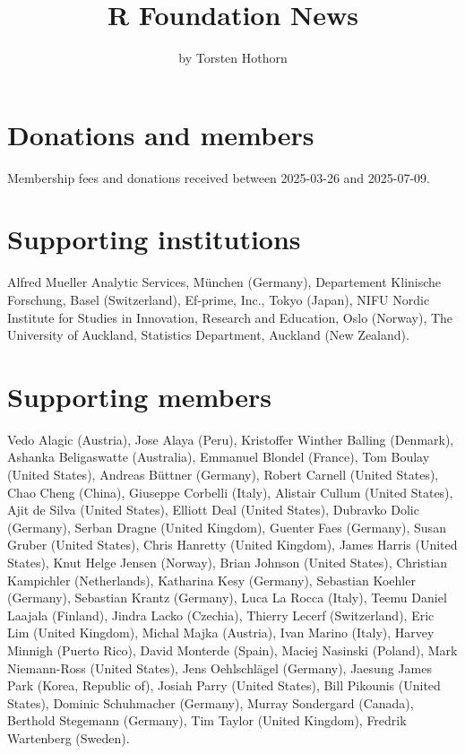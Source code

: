 \title{R Foundation News}


\author{by Torsten Hothorn}

\maketitle


\section{Donations and members}\label{donations-and-members}

Membership fees and donations received between
2025-03-26 and 2025-07-09.

\section{Supporting institutions}\label{supporting-institutions}

Alfred Mueller Analytic Services, München (Germany),
Departement Klinische Forschung, Basel (Switzerland),
Ef-prime, Inc., Tokyo (Japan),
NIFU Nordic Institute for Studies in Innovation, Research and Education, Oslo (Norway),
The University of Auckland, Statistics Department, Auckland (New Zealand).

\section{Supporting members}\label{supporting-members}

Vedo Alagic (Austria),
Jose Alaya (Peru),
Kristoffer Winther Balling (Denmark),
Ashanka Beligaswatte (Australia),
Emmanuel Blondel (France),
Tom Boulay (United States),
Andreas Büttner (Germany),
Robert Carnell (United States),
Chao Cheng (China),
Giuseppe Corbelli (Italy),
Alistair Cullum (United States),
Ajit de Silva (United States),
Elliott Deal (United States),
Dubravko Dolic (Germany),
Serban Dragne (United Kingdom),
Guenter Faes (Germany),
Susan Gruber (United States),
Chris Hanretty (United Kingdom),
James Harris (United States),
Knut Helge Jensen (Norway),
Brian Johnson (United States),
Christian Kampichler (Netherlands),
Katharina Kesy (Germany),
Sebastian Koehler (Germany),
Sebastian Krantz (Germany),
Luca La Rocca (Italy),
Teemu Daniel Laajala (Finland),
Jindra Lacko (Czechia),
Thierry Lecerf (Switzerland),
Eric Lim (United Kingdom),
Michal Majka (Austria),
Ivan Marino (Italy),
Harvey Minnigh (Puerto Rico),
David Monterde (Spain),
Maciej Nasinski (Poland),
Mark Niemann-Ross (United States),
Jens Oehlschlägel (Germany),
Jaesung James Park (Korea, Republic of),
Josiah Parry (United States),
Bill Pikounis (United States),
Dominic Schuhmacher (Germany),
Murray Sondergard (Canada),
Berthold Stegemann (Germany),
Tim Taylor (United Kingdom),
Fredrik Wartenberg (Sweden).


\address{%
Torsten Hothorn\\
Universität Zürich\\%
Switzerland\\
%
%
\textit{ORCiD: \href{https://orcid.org/0000-0001-8301-0471}{0000-0001-8301-0471}}\\%
\href{mailto:Torsten.Hothorn@R-project.org}{\nolinkurl{Torsten.Hothorn@R-project.org}}%
}
